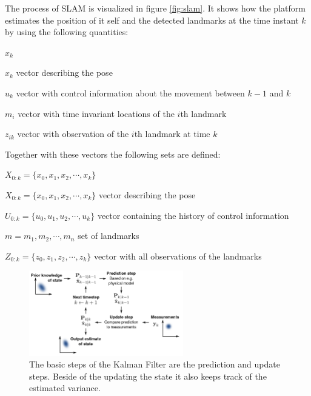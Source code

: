 The process of \ac{SLAM} is visualized in figure \ref{fig:slam}.
It shows how the platform estimates the position of it self and the detected landmarks at the time instant $k$ by using the following quantities\cite{durrant-Whyte2006}:

\begin{labeling}{$x_k$}
\item[\boldmath$x_k$] vector describing the pose
\item[\boldmath$u_k$] vector with control information about the movement between $k-1$ and $k$
\item[\boldmath$m_i$] vector with time invariant locations of the $i$th landmark
\item[\boldmath$z_{ik}$] vector with observation of the $i$th landmark at time $k$
\end{labeling}

Together with these vectors the following sets are defined:

\begin{labeling}{\boldmath$X_{0:k}=\{x_0, x_1, x_2, \cdots , x_k\}$}
\item[\boldmath$X_{0:k}=\{x_0, x_1, x_2, \cdots , x_k\}$] vector describing the pose
\item[\boldmath$U_{0:k}=\{u_0, u_1, u_2, \cdots , u_k\}$] vector containing the history of control information
\item[\boldmath$m={m_1, m_2, \cdots, m_n}$] set of landmarks
\item[\boldmath$Z_{0:k}=\{z_0, z_1, z_2, \cdots , z_k\}$] vector with all observations of the landmarks
\end{labeling}

\begin{figure}
    \centering
    \includegraphics[width=0.60\textwidth]{img/fundamentals/kalmanfilter.png}
    \caption{The basic steps of the Kalman Filter are the prediction and update steps. Beside of the updating the state it also keeps track of the estimated variance\cite{KalmanFilterImage}.}
    \label{fig:kalmanfilter}
\end{figure}

